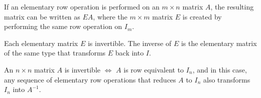 \documentclass[11pt]{scrartcl}
\theoremstyle{dotlessP}
\theoremstyle{dotlessN}
\begin{document}
\begin{remark}
	If an elementary row operation is performed on an $m \times n$ matrix $A$, the resulting matrix can be written as $EA$, where the $m \times m$ matrix $E$ is created by performing the same row operation on $I_m$.
\end{remark}
\begin{remark}
	Each elementary matrix $E$ is invertible. The inverse of $E$ is the elementary matrix of the same type that transforms $E$ back into $I$.
\end{remark}
\begin{theorem}
	An $n \times n$ matrix $A$ is invertible $\iff$ $A$ is row equivalent to $I_n$, and in this case, any sequence of elementary row operations that reduces $A$ to $I_n$ also transforms $I_n$ into $A^{-1}$.
\end{theorem}
\end{document}
